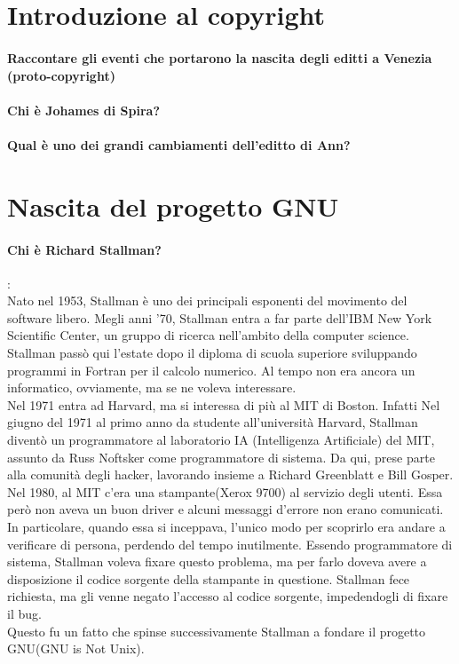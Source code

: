 \documentclass[a4paper]{article}
\begin{document}
	\section{Introduzione al copyright}
	
		\paragraph{Raccontare gli eventi che portarono la nascita degli editti a Venezia (proto-copyright)}
		
		\paragraph{Chi è Johames di Spira?} %
		
		\paragraph{Qual è uno dei grandi cambiamenti dell'editto di Ann?}
	
	
	\section{Nascita del progetto GNU}

		\paragraph{Chi è Richard Stallman?}: \\
		Nato nel 1953, Stallman è uno dei principali esponenti del movimento del software libero.
		Megli anni '70, Stallman entra a far parte dell'IBM New York Scientific Center, un gruppo di ricerca nell'ambito della computer science. Stallman passò qui l'estate dopo il diploma di scuola superiore sviluppando programmi in Fortran per il calcolo numerico. Al tempo non era ancora un informatico, ovviamente, ma se ne voleva interessare.\\
		Nel 1971 entra ad Harvard, ma si interessa di più al MIT di Boston. Infatti Nel giugno del 1971 al primo anno da studente all'università Harvard, Stallman diventò un programmatore al laboratorio IA (Intelligenza Artificiale) del MIT, assunto da Russ Noftsker come programmatore di sistema. Da qui, prese parte alla comunità degli hacker, lavorando insieme a Richard Greenblatt e Bill Gosper. \\
		Nel 1980, al MIT c'era una stampante(Xerox 9700) al servizio degli utenti. Essa però non aveva un buon driver e alcuni messaggi d'errore non erano comunicati. In particolare, quando essa si inceppava, l'unico modo per scoprirlo era andare a verificare di persona, perdendo del tempo inutilmente. Essendo programmatore di sistema, Stallman voleva fixare questo problema, ma per farlo doveva avere a disposizione il codice sorgente della stampante in questione. Stallman fece richiesta, ma gli venne negato l'accesso al codice sorgente, impedendogli di fixare il bug.\\
		Questo fu un fatto che spinse successivamente Stallman a fondare il progetto GNU(GNU is Not Unix).
		
\end{document}
